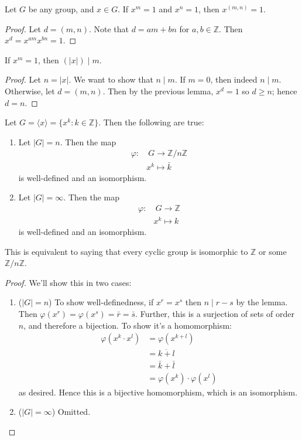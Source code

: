 \documentclass{article}
\theoremstyle{plain}
\newcommand{\Z}{\mathbb{Z}}
\begin{document}
\begin{lemma}{}{}
Let $G$ be any group, and $x \in G$. If $x^m = 1$ and $x^n = 1$, then $x^{(m,n)} = 1$.
\end{lemma}
\begin{proof}
Let $d = (m,n)$. Note that $d = am + bn$ for $a,b \in \Z$. Then $x^d = x^{am}x^{bn} = 1$.
\end{proof}
\begin{lemma}{}{}
If $x^m = 1$, then $(|x|)\mid m$.
\end{lemma}
\begin{proof}
Let $n = |x|$. We want to show that $n\mid m$. If $m=0$, then indeed $n\mid m$. Otherwise, let $d = (m,n)$. Then by the previous lemma, $x^d = 1$ so $d \ge n$; hence $d = n$.
\end{proof}
\begin{theorem}{}{}
Let $G = \langle x \rangle = \{x^k : k \in \Z \}$. Then the following are true:
\begin{enumerate}
\item Let $|G| = n$. Then the map
\begin{align*}
\varphi : &\ G \to \Z/n\Z \\
&x^k \mapsto \bar{k}
\end{align*}
is well-defined and an isomorphism.
\item Let $|G| = \infty$. Then the map
\begin{align*}
\varphi : &\ G \to \Z \\
&x^k \mapsto k
\end{align*}
is well-defined and an isomorphism.
\end{enumerate}
This is equivalent to saying that every cyclic group is isomorphic to $\Z$ or some $\Z/n\Z$.
\end{theorem}
\begin{proof}
We'll show this in two cases:
\begin{enumerate}
\item ($|G| = n$) To show well-definedness, if $x^r = x^s$ then $n\mid r-s$ by the lemma. Then $\varphi(x^r) = \varphi(x^s) = \bar{r} = \bar{s}$. Further, this is a surjection of sets of order $n$, and therefore a bijection. To show it's a homomorphism:
\begin{align*}
\varphi(x^k\cdot x^l) &= \varphi(x^{k+l}) \\
&= \overline{k+l} \\
&= \bar{k} + \bar{l} \\
&= \varphi(x^k)\cdot \varphi(x^l)
\end{align*}
as desired. Hence this is a bijective homomorphism, which is an isomorphism.
\item ($|G| = \infty$) Omitted.
\end{enumerate}
\end{proof}
\end{document}
